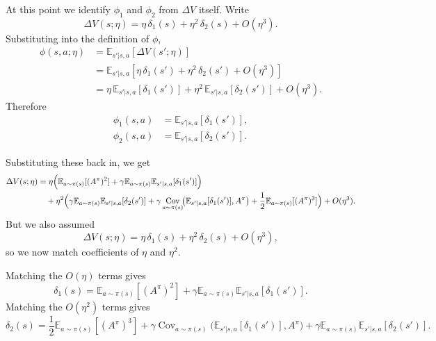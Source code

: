 \documentclass[11pt]{article}
\theoremstyle{definition}
\theoremstyle{remark}
\newcommand{\E}{\mathbb{E}}
\DeclareMathOperator{\Cov}{Cov}
\begin{document}
At this point we identify $\phi_1$ and $\phi_2$ from $\Delta V$ itself. Write
\begin{equation}
  \Delta V(s;\eta)
  =
  \eta\,\delta_1(s) + \eta^2\,\delta_2(s) + O(\eta^3).
\end{equation}
Substituting into the definition of $\phi$,
\begin{align}
  \phi(s,a;\eta)
  &= \E_{s'|s,a}[\Delta V(s';\eta)] \nonumber\\
  &= \E_{s'|s,a}\!\left[\eta\,\delta_1(s') + \eta^2\,\delta_2(s') + O(\eta^3)\right] \nonumber\\
  &= \eta\,\E_{s'|s,a}[\delta_1(s')]
   + \eta^2\,\E_{s'|s,a}[\delta_2(s')]
   + O(\eta^3).
\end{align}
Therefore
\begin{align}
  \phi_1(s,a) &= \E_{s'|s,a}[\delta_1(s')], \\
  \phi_2(s,a) &= \E_{s'|s,a}[\delta_2(s')].
\end{align}

Substituting these back in, we get
\begin{align}
  \Delta V(s;\eta)
  &=
  \eta\Bigl(
      \E_{a\sim\pi(s)}[(A^\pi)^2]
      + \gamma \E_{a\sim\pi(s)}\E_{s'|s,a}[\delta_1(s')]
    \Bigr) \nonumber\\
  &\quad
  + \eta^2\Bigl(
      \gamma \E_{a\sim\pi(s)}\E_{s'|s,a}[\delta_2(s')]
      + \gamma \Cov_{a\sim\pi(s)}\!\bigl(\E_{s'|s,a}[\delta_1(s')],A^\pi\bigr)
      + \frac12 \E_{a\sim\pi(s)}[(A^\pi)^3]
    \Bigr)
  + O(\eta^3).
\end{align}
But we also assumed
\[
  \Delta V(s;\eta)
  =
  \eta\,\delta_1(s) + \eta^2\,\delta_2(s) + O(\eta^3),
\]
so we now match coefficients of $\eta$ and $\eta^2$.

Matching the $O(\eta)$ terms gives
\begin{equation}\label{eq:delta1-correct}
  \delta_1(s)
  =
  \E_{a\sim\pi(s)}[(A^\pi)^2]
  + \gamma \E_{a\sim\pi(s)}\E_{s'|s,a}[\delta_1(s')].
\end{equation}
Matching the $O(\eta^2)$ terms gives
\begin{equation}\label{eq:delta2-correct}
  \delta_2(s)
  =
  \frac12 \E_{a\sim\pi(s)}[(A^\pi)^3]
  + \gamma \Cov_{a\sim\pi(s)}\!\bigl(\E_{s'|s,a}[\delta_1(s')],A^\pi\bigr)
  + \gamma \E_{a\sim\pi(s)}\E_{s'|s,a}[\delta_2(s')].
\end{equation}
\end{document}
